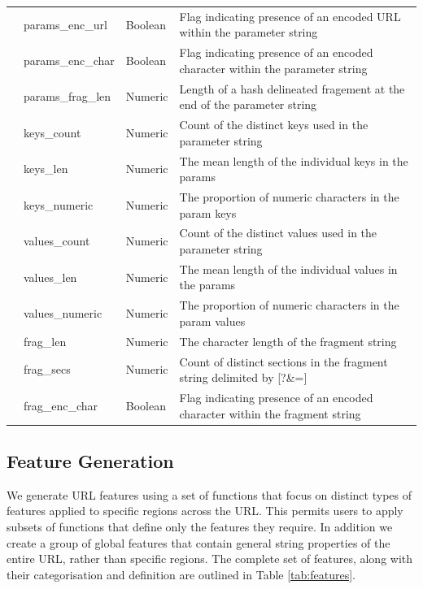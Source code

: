 \documentclass{aircc}
\begin{document}
\begin{table}
{\begin{tabular}{|l|l|l|l|}
              &params\_enc\_url       &Boolean     &Flag indicating presence of an encoded URL within the parameter string   \\
              &params\_enc\_char      &Boolean     &Flag indicating presence of an encoded character within the parameter string   \\
              &params\_frag\_len      &Numeric     &Length of a hash delineated fragement at the end of the parameter string   \\
              &keys\_count            &Numeric     &Count of the distinct keys used in the parameter string  \\
              &keys\_len              &Numeric     &The mean length of the individual keys in the params  \\
              &keys\_numeric          &Numeric     &The proportion of numeric characters in the param keys \\
              &values\_count          &Numeric     &Count of the distinct values used in the parameter string  \\
              &values\_len            &Numeric     &The mean length of the individual values in the params  \\
              &values\_numeric        &Numeric     &The proportion of numeric characters in the param values \\
              &frag\_len              &Numeric     &The character length of the fragment string    \\
              &frag\_secs             &Numeric     &Count of distinct sections in the fragment string delimited by [?\&=]  \\
              &frag\_enc\_char        &Boolean     &Flag indicating presence of an encoded character within the fragment string    \\
\bottomrule
\end{tabular}
}
\end{table}

\subsection{Feature Generation}

We generate URL features using a set of functions that focus on distinct types of features applied to specific 
regions across the URL. This permits users to apply subsets of functions that define only the features they
require. In addition we create a group of global features that contain general string properties of the entire 
URL, rather than specific regions. The complete set of features, along with their categorisation and definition
are outlined in Table \ref{tab:features}.
\end{document}
